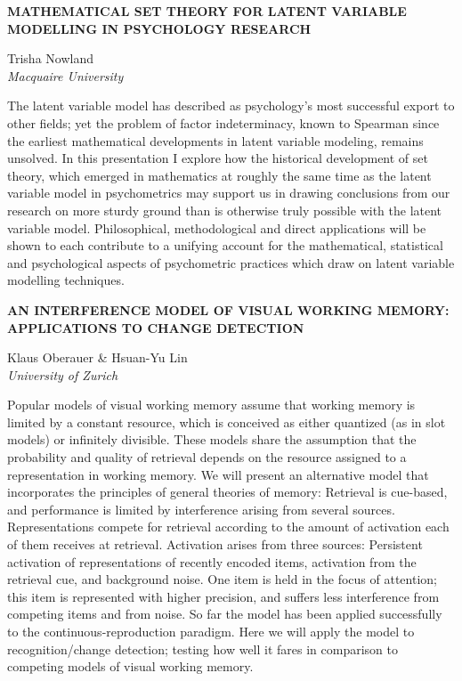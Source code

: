 \documentclass[]{article}
\begin{document}
\textbf{MATHEMATICAL SET THEORY FOR LATENT VARIABLE MODELLING IN
PSYCHOLOGY RESEARCH}

Trisha Nowland\\
\emph{Macquaire University}

The latent variable model has described as psychology's most successful
export to other fields; yet the problem of factor indeterminacy, known
to Spearman since the earliest mathematical developments in latent
variable modeling, remains unsolved. In this presentation I explore how
the historical development of set theory, which emerged in mathematics
at roughly the same time as the latent variable model in psychometrics
may support us in drawing conclusions from our research on more sturdy
ground than is otherwise truly possible with the latent variable model.
Philosophical, methodological and direct applications will be shown to
each contribute to a unifying account for the mathematical, statistical
and psychological aspects of psychometric practices which draw on latent
variable modelling techniques.\\
\pagebreak  

\textbf{AN INTERFERENCE MODEL OF VISUAL WORKING MEMORY: APPLICATIONS TO
CHANGE DETECTION}

Klaus Oberauer \& Hsuan-Yu Lin\\
\emph{University of Zurich}

Popular models of visual working memory assume that working memory is
limited by a constant resource, which is conceived as either quantized
(as in slot models) or infinitely divisible. These models share the
assumption that the probability and quality of retrieval depends on the
resource assigned to a representation in working memory. We will present
an alternative model that incorporates the principles of general
theories of memory: Retrieval is cue-based, and performance is limited
by interference arising from several sources. Representations compete
for retrieval according to the amount of activation each of them
receives at retrieval. Activation arises from three sources: Persistent
activation of representations of recently encoded items, activation from
the retrieval cue, and background noise. One item is held in the focus
of attention; this item is represented with higher precision, and
suffers less interference from competing items and from noise. So far
the model has been applied successfully to the continuous-reproduction
paradigm. Here we will apply the model to recognition/change detection;
testing how well it fares in comparison to competing models of visual
working memory.\\
\pagebreak  
\end{document}
